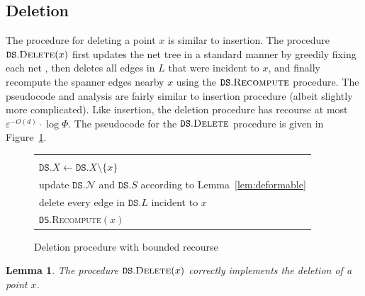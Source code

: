 \documentclass[11pt]{article}
\makeatletter
\let\e\varepsilon               %
\def\set#1{\{ #1 \}}
\def\EMPH#1{\emph{\textcolor{BrickRed} {#1}}}
\def\begin@lgo{\begin{minipage}{1in}\small\begin{tabbing}
        \quad\=\qquad\=\qquad\=\qquad\=\qquad\=\qquad\=\qquad\=\qquad\=\qquad\=\qquad\=\qquad\=\qquad\=\qquad\=\kill}
\def\end@lgo{\end{tabbing}\end{minipage}}
\newenvironment{algorithm}
{\begin{tabular}{|l|}\hline\begin@lgo}
{\end@lgo\\\hline\end{tabular}}
\newcommand \myul[4]{%
  \begingroup%
  \renewcommand \ULdepth {#1}%
  \renewcommand \ULthickness {#2}%
  \contourlength{#3}%
  \uline{\phantom{#4}}\llap{\contour{white}{#4}}%
  \endgroup%
}
\def\ul#1{\myul{2pt}{0.6pt}{1pt}{#1}}
\newtheorem{lemma}[theorem]{Lemma}
\newcommand{\cN}{\mathcal{N}}
\newcommand{\ddim}{\ensuremath{d}}
\newcommand{\DS}{\texttt{DS}}
\newcommand{\points}{{\ensuremath{\DS.X}}}
\newcommand{\sparse}{{\ensuremath{\DS.S}}}
\newcommand{\net}{{\ensuremath{\DS.\cN}}}
\newcommand{\light}{{\ensuremath{\DS.L}}}
\makeatother
\begin{document}
\subsection{Deletion}
The procedure for deleting a point $x$ is similar to insertion. The procedure \EMPH{$\DS.\textsc{Delete}(x)$} first updates the net tree in a standard manner by greedily fixing each net \cite{gao2004deformable,KL04}, then deletes all edges in $L$ that were incident to $x$, and finally recompute the spanner edges nearby $x$ using the $\DS.\textsc{Recompute}$ procedure. The pseudocode and analysis are fairly similar to insertion procedure (albeit slightly more complicated).
Like insertion, the deletion procedure has recourse at most $\e^{-O(\ddim)} \cdot \log \Phi$. 
% 
The pseudocode for the $\DS.\textsc{Delete}$ procedure is given in Figure~\ref{fig:delete-recourse}.
%
\begin{figure}[h!]
\centering
\begin{algorithm}
    \ul{$\DS.\textsc{Delete}(x)$}:\+
    \\ $\points \gets \points \setminus \set{x}$
    \\ update $\net$ and $\sparse$ according to Lemma~\ref{lem:deformable}
    \\ delete every edge in $\light$ incident to $x$
    \\ \DS.\textsc{Recompute}$(x)$
\end{algorithm}
\caption{Deletion procedure with bounded recourse}
\label{fig:delete-recourse}
\end{figure}
%
%
\begin{lemma}
\label{lem:delete-invariants}
The procedure $\DS.\textsc{Delete}(x)$ correctly implements the deletion of a point $x$.    
\end{lemma}
\end{document}
